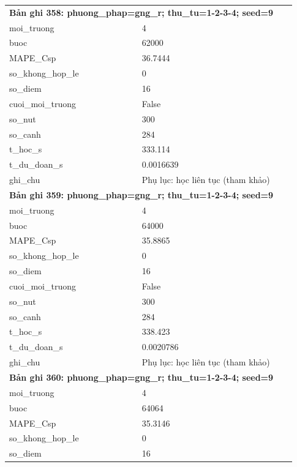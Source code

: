 \begin{longtable}{p{0.43\linewidth}p{0.50\linewidth}}
\midrule
\multicolumn{2}{p{0.95\linewidth}}{\textbf{Bản ghi 358: phuong\_phap=gng\_r; thu\_tu=1-2-3-4; seed=9}} \\
moi\_\allowbreak truong & 4 \\
buoc & 62000 \\
MAPE\_\allowbreak Csp & 36.7444 \\
so\_\allowbreak khong\_\allowbreak hop\_\allowbreak le & 0 \\
so\_\allowbreak diem & 16 \\
cuoi\_\allowbreak moi\_\allowbreak truong & False \\
so\_\allowbreak nut & 300 \\
so\_\allowbreak canh & 284 \\
t\_\allowbreak hoc\_\allowbreak s & 333.114 \\
t\_\allowbreak du\_\allowbreak doan\_\allowbreak s & 0.0016639 \\
ghi\_\allowbreak chu & Phụ lục: học liên tục (tham khảo) \\
\midrule
\multicolumn{2}{p{0.95\linewidth}}{\textbf{Bản ghi 359: phuong\_phap=gng\_r; thu\_tu=1-2-3-4; seed=9}} \\
moi\_\allowbreak truong & 4 \\
buoc & 64000 \\
MAPE\_\allowbreak Csp & 35.8865 \\
so\_\allowbreak khong\_\allowbreak hop\_\allowbreak le & 0 \\
so\_\allowbreak diem & 16 \\
cuoi\_\allowbreak moi\_\allowbreak truong & False \\
so\_\allowbreak nut & 300 \\
so\_\allowbreak canh & 284 \\
t\_\allowbreak hoc\_\allowbreak s & 338.423 \\
t\_\allowbreak du\_\allowbreak doan\_\allowbreak s & 0.0020786 \\
ghi\_\allowbreak chu & Phụ lục: học liên tục (tham khảo) \\
\midrule
\multicolumn{2}{p{0.95\linewidth}}{\textbf{Bản ghi 360: phuong\_phap=gng\_r; thu\_tu=1-2-3-4; seed=9}} \\
moi\_\allowbreak truong & 4 \\
buoc & 64064 \\
MAPE\_\allowbreak Csp & 35.3146 \\
so\_\allowbreak khong\_\allowbreak hop\_\allowbreak le & 0 \\
so\_\allowbreak diem & 16 \\

\end{longtable}
